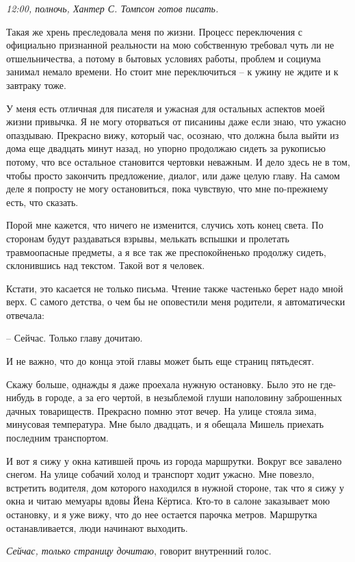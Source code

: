 \documentclass[
]{book}
\begin{document}
\emph{12:00, полночь, Хантер С. Томпсон готов писать.}

Такая же хрень преследовала меня по жизни. Процесс переключения с официально признанной реальности на мою собственную требовал чуть ли не отшельничества, а потому в бытовых условиях работы, проблем и социума занимал немало времени. Но стоит мне переключиться -- к ужину не ждите и к завтраку тоже.

У меня есть отличная для писателя и ужасная для остальных аспектов моей жизни привычка. Я не могу оторваться от писанины даже если знаю, что ужасно опаздываю. Прекрасно вижу, который час, осознаю, что должна была выйти из дома еще двадцать минут назад, но упорно продолжаю сидеть за рукописью потому, что все остальное становится чертовки неважным. И дело здесь не в том, чтобы просто закончить предложение, диалог, или даже целую главу. На самом деле я попросту не могу остановиться, пока чувствую, что мне по-прежнему есть, что сказать.

Порой мне кажется, что ничего не изменится, случись хоть конец света. По сторонам будут раздаваться взрывы, мелькать вспышки и пролетать травмоопасные предметы, а я все так же преспокойненько продолжу сидеть, склонившись над текстом. Такой вот я человек.

Кстати, это касается не только письма. Чтение также частенько берет надо мной верх. С самого детства, о чем бы не оповестили меня родители, я автоматически отвечала:

-- Сейчас. Только главу дочитаю.

И не важно, что до конца этой главы может быть еще страниц пятьдесят.

Скажу больше, однажды я даже проехала нужную остановку. Было это не где-нибудь в городе, а за его чертой, в незыблемой глуши наполовину заброшенных дачных товариществ. Прекрасно помню этот вечер. На улице стояла зима, минусовая температура. Мне было двадцать, и я обещала Мишель приехать последним транспортом.

И вот я сижу у окна катившей прочь из города маршрутки. Вокруг все завалено снегом. На улице собачий холод и транспорт ходит ужасно. Мне повезло, встретить водителя, дом которого находился в нужной стороне, так что я сижу у окна и читаю мемуары вдовы Йена Кёртиса. Кто-то в салоне заказывает мою остановку, и я уже вижу, что до нее остается парочка метров. Маршрутка останавливается, люди начинают выходить.

\emph{Сейчас, только страницу дочитаю}, говорит внутренний голос.
\end{document}
